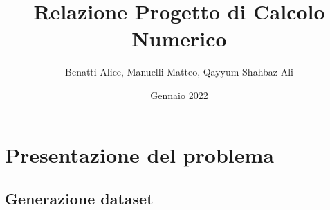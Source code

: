 \documentclass{article}
\title{\textbf{Relazione Progetto di Calcolo Numerico}}
\author{Benatti Alice, Manuelli Matteo, Qayyum Shahbaz Ali}
\date{Gennaio 2022}
\begin{document}
\graphicspath{{./img/}}
\maketitle

\tableofcontents
\newpage

\begin{comment}
Relazione

1. Riportare e commentare i risultati ottenuti nei punti 2. 3. (e 4.) 
su un immagine del set creato e su altre due immagini in bianco e nero 
(fotografiche/mediche/astronomiche)
2. Riportare delle tabelle con le misure di PSNR e MSE ottenute al 
variare dei parametri (dimensione kernel, valore di sigma, la 
deviazione standard del rumore, il parametro di regolarizzazione). 
3. Calcolare sull’intero set di immagini medie e deviazione standard 
delle metriche per alcuni valori fissati dei parametri.  
4. Analizzare su 2 esecuzioni le proprietà dei metodi numerici 
utilizzati (gradiente coniugato e gradiente) in termini di numero di 
iterazioni, andamento dell’errore, della funzione obiettivo, norma del 
gradiente. 
\end{comment}

\section{Presentazione del problema}

    \subsection{Generazione dataset}
    
    
    

    
    
\end{document}
